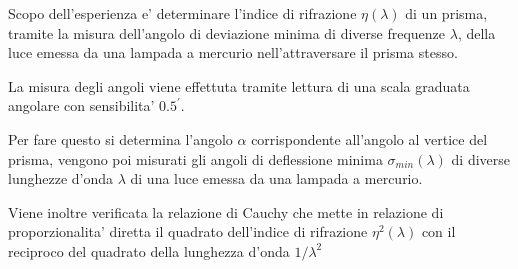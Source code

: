Scopo dell'esperienza e' determinare l'indice di rifrazione $\eta (\lambda)$ di un prisma, tramite la misura dell'angolo di deviazione minima di diverse frequenze $\lambda$, della luce emessa da una lampada a mercurio nell'attraversare il prisma stesso.

La misura degli angoli viene effettuta tramite lettura di una scala graduata angolare con sensibilita' $0.5^{\prime}$.

Per fare questo si determina l'angolo $\alpha$ corrispondente all'angolo al vertice del prisma, vengono poi misurati gli angoli di deflessione minima $\sigma_{min} (\lambda)$ di diverse lunghezze d'onda $\lambda$ di una luce emessa da una lampada a mercurio.


Viene inoltre verificata la relazione di Cauchy che mette in relazione di proporzionalita' diretta il quadrato dell'indice di rifrazione $\eta^2 (\lambda)$ con il reciproco del quadrato della lunghezza d'onda $1/ \lambda^2$